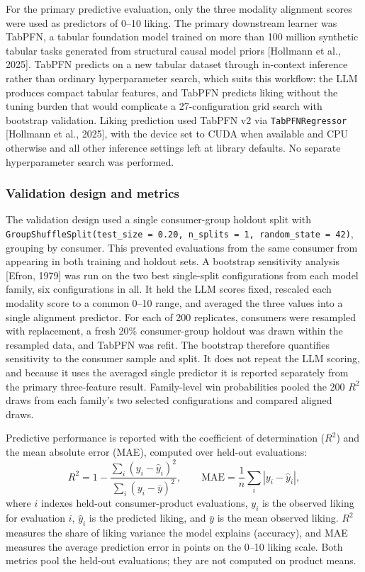 \documentclass[11pt]{article}
\begin{document}
For the primary predictive evaluation, only the three modality alignment
scores were used as predictors of 0--10 liking. The primary downstream learner
was TabPFN, a tabular foundation model trained on more than 100 million
synthetic tabular tasks generated from structural causal model priors
[Hollmann et al., 2025]. TabPFN predicts on a new tabular dataset through
in-context inference rather than ordinary hyperparameter search, which suits
this workflow: the LLM produces compact tabular features, and TabPFN predicts
liking without the tuning burden that would complicate a 27-configuration grid
search with bootstrap validation. Liking prediction used TabPFN v2 via
\texttt{TabPFNRegressor} [Hollmann et al., 2025], with the device set to CUDA
when available and CPU otherwise and all other inference settings left at
library defaults. No separate hyperparameter search was performed.

\subsubsection{Validation design and metrics}
\label{sec:validation}

The validation design used a single consumer-group holdout split with
\texttt{GroupShuffleSplit(test\_size = 0.20, n\_splits = 1, random\_state =
42)}, grouping by consumer. This prevented evaluations from the same consumer
from appearing in both training and holdout sets. A bootstrap sensitivity
analysis [Efron, 1979] was run on the two best single-split configurations
from each model family, six configurations in all. It held the LLM scores
fixed, rescaled each modality score to a common 0--10 range, and averaged the
three values into a single alignment predictor. For each of 200 replicates,
consumers were resampled with replacement, a fresh 20\% consumer-group holdout
was drawn within the resampled data, and TabPFN was refit. The bootstrap
therefore quantifies sensitivity to the consumer sample and split. It does not
repeat the LLM scoring, and because it uses the averaged single predictor it
is reported separately from the primary three-feature result. Family-level
win probabilities pooled the 200 $R^2$ draws from each family's two selected
configurations and compared aligned draws.

Predictive performance is reported with the coefficient of determination
($R^2$) and the mean absolute error (MAE), computed over held-out evaluations:
\[
R^2 = 1 - \frac{\sum_i (y_i - \hat{y}_i)^2}{\sum_i (y_i - \bar{y})^2},
\qquad
\mathrm{MAE} = \frac{1}{n}\sum_i |y_i - \hat{y}_i|,
\]
where $i$ indexes held-out consumer-product evaluations, $y_i$ is the observed
liking for evaluation $i$, $\hat{y}_i$ is the predicted liking, and $\bar{y}$
is the mean observed liking. $R^2$ measures the share of liking variance the
model explains (accuracy), and MAE measures the average prediction error in
points on the 0--10 liking scale. Both metrics pool the held-out evaluations;
they are not computed on product means.
\end{document}

